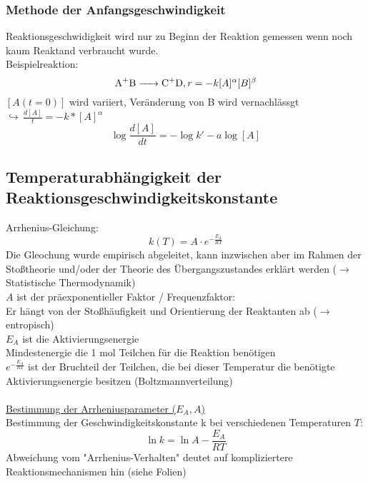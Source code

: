 \documentclass[a4paper, fleqn]{article}
\begin{document}
\subsubsection{Methode der Anfangsgeschwindigkeit}
Reaktionsgeschwidigkeit wird nur zu Beginn der Reaktion gemessen wenn noch kaum Reaktand verbraucht wurde.\\
Beispielreaktion:\\
\begin{equation*}
    \ce{A+B -> C+D}, r = -k[A]^\alpha[B]^\beta
\end{equation*}
$[A(t=0)]$ wird variiert, Veränderung von B wird vernachlässgt\\
$\hookrightarrow\, \frac{d[A]}{t} = -k*[A]^\alpha$\\
\begin{equation*}
    \log \frac{d[A]}{dt} = -\log k' - a \log [A]
\end{equation*} 
\subsection{Temperaturabhängigkeit der Reaktionsgeschwindigkeitskonstante}
Arrhenius-Gleichung:
\begin{equation*}
    k(T) = A\cdot e^{-\frac{E_A}{RT}}
\end{equation*}
Die Gleochung wurde empirisch abgeleitet, kann inzwischen aber im Rahmen der Stoßtheorie und/oder der Theorie des Übergangszustandes erklärt werden ($\rightarrow$ Statistische Thermodynamik)\\
$A$ ist der präexponentieller Faktor / Frequenzfaktor:\\
Er hängt von der Stoßhäufigkeit und Orientierung der Reaktanten ab ($\rightarrow$ entropisch)\\
$E_A$ ist die Aktivierungsenergie\\
Mindestenergie die 1 mol Teilchen für die Reaktion benötigen\\
$e^{-\frac{E_A}{RT}}$ ist der Bruchteil der Teilchen, die bei dieser Temperatur die benötigte Aktivierungsenergie besitzen (Boltzmannverteilung)\\\\
\underline{Bestimmung der Arrheniusparameter ($E_A, A$)}\\
Bestimmung der Geschwindigkeitskonstante k bei verschiedenen Temperaturen $T$:\\
\begin{equation*}
    \ln k = \ln A - \frac{E_A}{RT}
\end{equation*}
Abweichung vom "Arrhenius-Verhalten" deutet auf kompliziertere Reaktionsmechanismen hin (siehe Folien)\\
\end{document}
